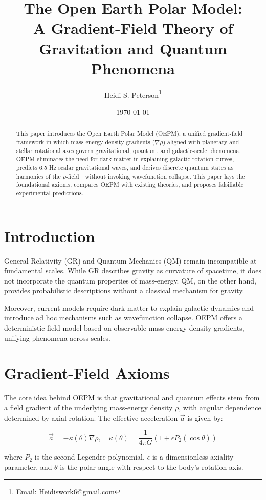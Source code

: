 \documentclass[12pt]{article}
\title{\textbf{The Open Earth Polar Model:\\ A Gradient-Field Theory of Gravitation and Quantum Phenomena}}
\author{Heidi S. Peterson\thanks{Email: \href{mailto:Heidiswork6@gmail.com}{Heidiswork6@gmail.com}}}
\affil{Independent Researcher}
\date{\today}
\begin{document}
\maketitle

\begin{abstract}
This paper introduces the Open Earth Polar Model (OEPM), a unified gradient-field framework in which mass-energy density gradients ($\nabla\rho$) aligned with planetary and stellar rotational axes govern gravitational, quantum, and galactic-scale phenomena. OEPM eliminates the need for dark matter in explaining galactic rotation curves, predicts 6.5 Hz scalar gravitational waves, and derives discrete quantum states as harmonics of the $\rho$-field—without invoking wavefunction collapse. This paper lays the foundational axioms, compares OEPM with existing theories, and proposes falsifiable experimental predictions.
\end{abstract}

\section{Introduction}
General Relativity (GR) and Quantum Mechanics (QM) remain incompatible at fundamental scales. While GR describes gravity as curvature of spacetime, it does not incorporate the quantum properties of mass-energy. QM, on the other hand, provides probabilistic descriptions without a classical mechanism for gravity.

Moreover, current models require dark matter to explain galactic dynamics and introduce ad hoc mechanisms such as wavefunction collapse. OEPM offers a deterministic field model based on observable mass-energy density gradients, unifying phenomena across scales.

\section{Gradient-Field Axioms}
The core idea behind OEPM is that gravitational and quantum effects stem from a field gradient of the underlying mass-energy density $\rho$, with angular dependence determined by axial rotation. The effective acceleration $\vec{a}$ is given by:

\begin{equation}
\vec{a} = -\kappa(\theta)\nabla\rho, \quad \kappa(\theta) = \frac{1}{4\pi G}(1 + \epsilon P_2(\cos\theta))
\end{equation}

where $P_2$ is the second Legendre polynomial, $\epsilon$ is a dimensionless axiality parameter, and $\theta$ is the polar angle with respect to the body's rotation axis.
\end{document}
